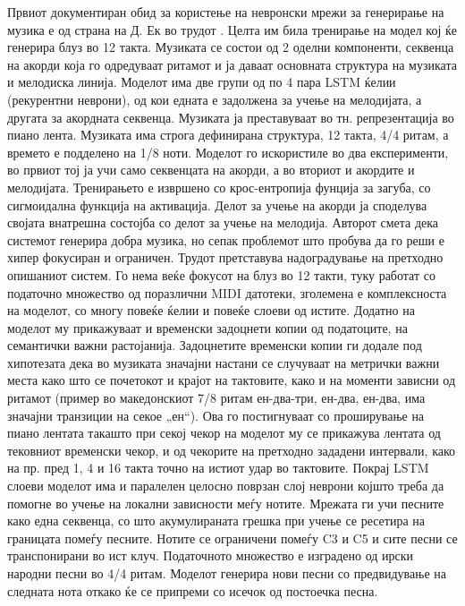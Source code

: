 Првиот документиран обид за користење на невронски мрежи за генерирање на музика е од страна на Д. Ек во трудот \cite{Eck2002}. Целта им била тренирање на модел кој ќе генерира блуз во 12 такта. Музиката се состои од 2 оделни компоненти, секвенца на акорди која го одредуваат ритамот и ја даваат основната структура на музиката и мелодиска линија. Моделот има две групи од по 4 пара LSTM ќелии (рекурентни неврони), од кои едната е задолжена за учење на мелодијата, а другата за акордната секвенца. Музиката ја преставуваат во тн. репрезентација во пиано лента. Музиката има строга дефинирана структура, 12 такта, 4/4 ритам, а времето е подделено на 1/8 ноти. Моделот го искористиле во два експерименти, во првиот тој ја учи само секвенцата на акорди, а во вториот и акордите и мелодијата. Тренирањето е извршено со крос-ентропија фунција за загуба, со сигмоидална функција на активација. Делот за учење на акорди ја споделува својата внатрешна состојба со делот за учење на мелодија. Авторот смета дека системот генерира добра музика, но сепак проблемот што пробува да го реши е хипер фокусиран и ограничен. Трудот \cite{Eck2008} претставува надоградување на претходно опишаниот систем. Го нема веќе фокусот на блуз во 12 такти, туку работат со податочно множество од поразлични MIDI датотеки, зголемена е комплексноста на моделот, со многу повеќе ќелии и повеќе слоеви од истите. Додатно на моделот му прикажуваат и временски задоцнети копии од податоците, на семантички важни растојанија. Задоцнетите временски копии ги додале под хипотезата дека во музиката значајни настани се случуваат на метрички важни места како што се почетокот и крајот на тактовите, како и на моменти зависни од ритамот (пример во македонскиот 7/8 ритам ен-два-три, ен-два, ен-два, има значајни транзиции на секое „ен“). Ова го постигнуваат со проширување на пиано лентата такашто при секој чекор на моделот му се прикажува лентата од тековниот временски чекор, и од чекорите на претходно зададени интервали, како на пр. пред 1, 4 и 16 такта точно на истиот удар во тактовите. Покрај LSTM слоеви моделот има и паралелен целосно поврзан слој неврони којшто треба да помогне во учење на локални зависности меѓу нотите. Мрежата ги учи песните како една секвенца, со што акумулираната грешка при учење се ресетира на границата помеѓу песните. Нотите се ограничени помеѓу C3 и C5 и сите песни се транспонирани во ист клуч. Податочното множество е изградено од  ирски народни песни во 4/4 ритам. Моделот генерира нови песни со предвидување на следната нота откако ќе се припреми со исечок од постоечка песна.

